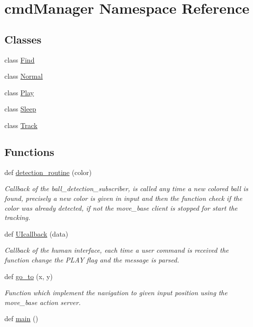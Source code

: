 \hypertarget{namespacecmdManager}{}\section{cmd\+Manager Namespace Reference}
\label{namespacecmdManager}
\subsection*{Classes}
\begin{DoxyCompactItemize}
\item 
class \hyperlink{classcmdManager_1_1Find}{Find}
\item 
class \hyperlink{classcmdManager_1_1Normal}{Normal}
\item 
class \hyperlink{classcmdManager_1_1Play}{Play}
\item 
class \hyperlink{classcmdManager_1_1Sleep}{Sleep}
\item 
class \hyperlink{classcmdManager_1_1Track}{Track}
\end{DoxyCompactItemize}
\subsection*{Functions}
\begin{DoxyCompactItemize}
\item 
def \hyperlink{namespacecmdManager_a62a68181d751176538db8063d7b11987}{detection\+\_\+routine} (color)
\begin{DoxyCompactList}\small\item\em Callback of the ball\+\_\+detection\+\_\+subscriber, is called any time a new colored ball is found, precisely a new color is given in input and then the function check if the color was already detected, if not the move\+\_\+base client is stopped for start the tracking. \end{DoxyCompactList}\item 
def \hyperlink{namespacecmdManager_a50ab72ebc575eb7032c50d17a6d592c6}{U\+Icallback} (data)
\begin{DoxyCompactList}\small\item\em Callback of the human interface, each time a user command is received the function change the P\+L\+AY flag and the message is parsed. \end{DoxyCompactList}\item 
def \hyperlink{namespacecmdManager_ac53d2d1248b660039d5a90768ff3bd5e}{go\+\_\+to} (x, y)
\begin{DoxyCompactList}\small\item\em Function which implement the navigation to given input position using the move\+\_\+base action server. \end{DoxyCompactList}\item 
def \hyperlink{namespacecmdManager_a3e64a5e295736776673178e6ff94d1e5}{main} ()
\end{DoxyCompactItemize}
